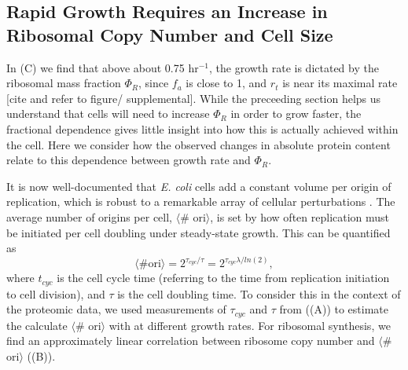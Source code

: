 \subsection{Rapid Growth Requires an Increase in Ribosomal Copy Number and Cell Size}


In (C) we find that above about 0.75 hr$^{-1}$, the growth
rate is dictated by the ribosomal mass fraction $\Phi_R$, since $f_a$ is close
to 1, and $r_t$ is near its maximal rate [cite and refer to figure/
supplemental]. While the preceeding section helps us understand that cells will
need to increase $\Phi_R$ in order to grow faster, the fractional dependence
gives little insight into how this is actually achieved within the cell. Here we
consider how the observed changes in absolute protein content
relate to this dependence between growth rate and $\Phi_R$.

It is now well-documented that \textit{E. coli} cells add a constant volume per
origin of replication, which is robust to a remarkable array of cellular
perturbations \citep{si2017}.  The average number of origins per cell, $\langle$\#
ori$\rangle$, is set by how often replication must be initiated per cell doubling
under steady-state growth. This can be quantified as
\begin{equation}
    \langle \text{\# ori} \rangle = 2^{\tau_{cyc} / \tau} = 2^{\tau_{cyc} \lambda / ln(2)},
    \label{eq:Nori}
\end{equation}
where $t_{cyc}$ is the cell cycle time (referring to the time from replication
initiation to cell division), and $\tau$ is the cell doubling time. To consider
this  in the context of the proteomic data, we used measurements of $\tau_{cyc}$
and  $\tau$ from \cite{si2017} ((A)) to estimate
the calculate $\langle$\# ori$\rangle$  with  at different growth
rates. For ribosomal synthesis, we find an approximately linear correlation
between ribosome copy number and $\langle$\# ori$\rangle$
((B)).


